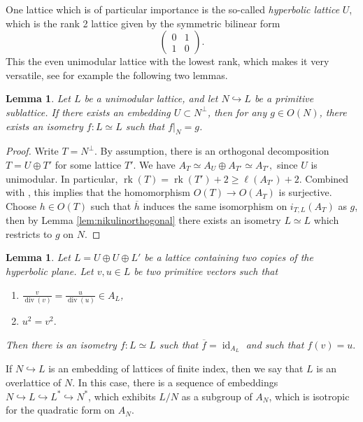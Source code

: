 \documentclass[11pt,twoside]{amsart}
\numberwithin{equation}{section}
\newtheorem{lemma}[dummy]{Lemma}
\theoremstyle{definition}
\theoremstyle{plain}
\def\rk{\operatorname{rk}}
\def\dv{\operatorname{div}}
\begin{document}
One lattice which is of particular importance is the so-called \textit{hyperbolic lattice} $U$, which is the rank 2 lattice given by the symmetric bilinear form $$\left(\begin{matrix}
0 & 1\\
1& 0
\end{matrix}\right).$$ This the even unimodular lattice with the lowest rank, which makes it very versatile, see for example the following two lemmas. 

\begin{lemma}\cite[Proposition 1.14.1]{Nik80}\label{lem:extendisometryhyperbolic}
    Let $L$ be a unimodular lattice, and let $N\hookrightarrow L$ be a primitive sublattice. If there exists an embedding $U\subset N^\perp$, then for any $g\in O(N)$, there exists an isometry $f: L\simeq L$ such that $f|_{N} = g$.
\end{lemma}
\begin{proof}
    Write $T = N^\perp$. By assumption, there is an orthogonal decomposition $T = U\oplus T'$ for some lattice $T'$. We have $A_T \simeq A_U\oplus A_{T'}\simeq A_{T'},$ since $U$ is unimodular. In particular, $\rk(T) = \rk(T')+2 \geq \ell(A_{T'})+2.$ Combined with \cite[Theorem 1.14.2]{Nik80}, this implies that the homomorphism $O(T)\to O(A_T)$ is surjective. Choose $h\in O(T)$ such that $\overline{h}$ induces the same isomorphism on $i_{T,L}(A_T)$ as $g$, then by Lemma \ref{lem:nikulinorthogonal} there exists an isometry $L\simeq L$ which restricts to $g$ on $N$.
\end{proof}

\begin{lemma}\label{lem:eichlertransvections}\cite[Proposition 3.3]{GHS07}
    Let $L = U\oplus U\oplus L'$ be a lattice containing two copies of the hyperbolic plane. Let $v,u\in L$ be two primitive vectors such that 
    \begin{enumerate}
        \item[i)] $\frac{v}{\dv(v)} = \frac{u}{\dv(u)}\in A_L$,
        \item[ii)] $u^2 = v^2.$
    \end{enumerate}
    Then there is an isometry $f: L\simeq L$ such that $\overline{f} = \operatorname{id}_{A_L}$ and such that $f(v) = u.$
\end{lemma}

If $N\hookrightarrow L$ is an embedding of lattices of finite index, then we say that $L$ is an overlattice of $N$. In this case, there is a sequence of embeddings $N\hookrightarrow L\hookrightarrow L^*\hookrightarrow N^*$, which exhibits $L/N$ as a subgroup of $A_N$, which is isotropic for the quadratic form on $A_N$.
\end{document}
